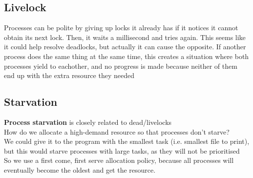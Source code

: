 \documentclass{article}
\begin{document}
\subsection*{Livelock}
Processes can be polite by giving up locks it already has if it notices it cannot obtain its next lock. Then, it waits a millisecond and tries again. This seems like it could help resolve deadlocks, but actually it can cause the opposite. If another process does the same thing at the same time, this creates a situation where both processes yield to eachother, and no progress is made because neither of them end up with the extra resource they needed
\subsection*{Starvation}
\textbf{Process starvation} is closely related to dead/livelocks
\\How do we allocate a high-demand resource so that processes don't starve?
\\We could give it to the program with the smallest task (i.e. smallest file to print), but this would starve processes with large tasks, as they will not be prioritised
\\So we use a first come, first serve allocation policy, because all processes will eventually become the oldest and get the resource.
\end{document}
